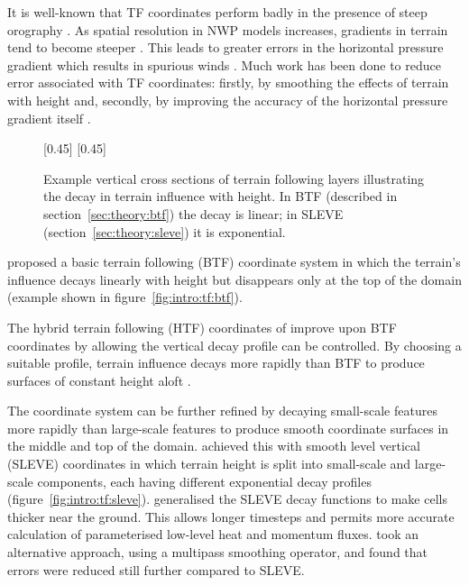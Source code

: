 It is well-known that TF coordinates perform badly in the presence of steep orography \autocite{gary1973}.  As spatial resolution in NWP models increases, gradients in terrain tend to become steeper \autocite{steppeler2002}.  This leads to greater errors in the horizontal pressure gradient which results in spurious winds \autocite{dempsey-davis1998}.  Much work has been done to reduce error associated with TF coordinates: firstly, by smoothing the effects of terrain with height \parencites{simmons-burridge1981}{schaer2002}{klemp2011} and, secondly, by improving the accuracy of the horizontal pressure gradient itself \parencites{mahrer1984}{klemp2011}{zaengl2012}.

\begin{figure}
	\captionsetup[subfigure]{position=b}
	\centering
	[0.45\textwidth]{}
	\hfill
	[0.45\textwidth]{}
	\caption{Example vertical cross sections of terrain following layers illustrating the decay in terrain influence with height.   In BTF (described in section~\ref{sec:theory:btf}) the decay is linear; in SLEVE (section~\ref{sec:theory:sleve}) it is exponential.}
	\label{fig:intro:tf}
\end{figure}

\textcite{galchen-somerville1975} proposed a basic terrain following (BTF) coordinate system in which the terrain's influence decays linearly with height but disappears only at the top of the domain (example shown in figure~\ref{fig:intro:tf:btf}).

The hybrid terrain following (HTF) coordinates of \textcite{simmons-burridge1981} improve upon BTF coordinates by allowing the vertical decay profile can be controlled.  By choosing a suitable profile, terrain influence decays more rapidly than BTF to produce surfaces of constant height aloft \autocite{klemp2011}.

The coordinate system can be further refined by decaying small-scale features more rapidly than large-scale features to produce smooth coordinate surfaces in the middle and top of the domain.  \textcite{schaer2002} achieved this with smooth level vertical (SLEVE) coordinates in which terrain height is split into small-scale and large-scale components, each having different exponential decay profiles (figure~\ref{fig:intro:tf:sleve}).
\textcite{leuenberger2010} generalised the SLEVE decay functions to make cells thicker near the ground.  This allows longer timesteps and permits more accurate calculation of parameterised low-level heat and momentum fluxes.
\textcite{klemp2011} took an alternative approach, using a multipass smoothing operator, and found that errors were reduced still further compared to SLEVE.

